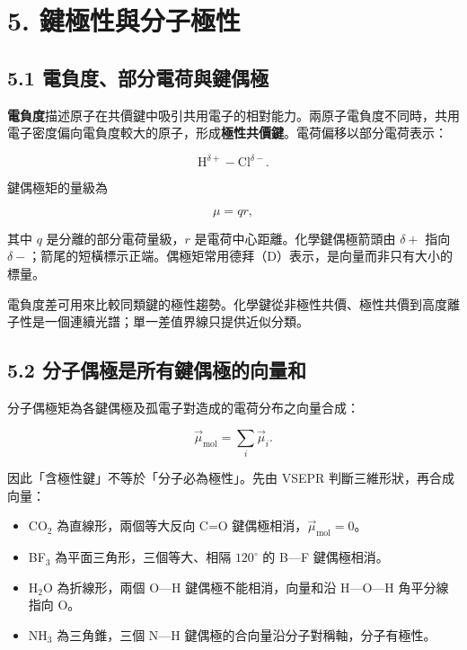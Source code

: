 \documentclass[11pt,a4paper]{article}
\providecommand{\tightlist}{%
  \setlength{\itemsep}{0pt}\setlength{\parskip}{0pt}}
\begin{document}
\section{5. 鍵極性與分子極性}\label{ux9375ux6975ux6027ux8207ux5206ux5b50ux6975ux6027}

\subsection{5.1 電負度、部分電荷與鍵偶極}\label{ux96fbux8ca0ux5ea6ux90e8ux5206ux96fbux8377ux8207ux9375ux5076ux6975}

\textbf{電負度}描述原子在共價鍵中吸引共用電子的相對能力。兩原子電負度不同時，共用電子密度偏向電負度較大的原子，形成\textbf{極性共價鍵}。電荷偏移以部分電荷表示：

\[
\mathrm H^{\delta+}\!-\!\mathrm{Cl}^{\delta-}.
\]

鍵偶極矩的量級為

\[
\mu=qr,
\]

其中 \(q\) 是分離的部分電荷量級，\(r\) 是電荷中心距離。化學鍵偶極箭頭由 \(\delta+\) 指向 \(\delta-\)；箭尾的短橫標示正端。偶極矩常用德拜（D）表示，是向量而非只有大小的標量。

電負度差可用來比較同類鍵的極性趨勢。化學鍵從非極性共價、極性共價到高度離子性是一個連續光譜；單一差值界線只提供近似分類。

\subsection{5.2 分子偶極是所有鍵偶極的向量和}\label{ux5206ux5b50ux5076ux6975ux662fux6240ux6709ux9375ux5076ux6975ux7684ux5411ux91cfux548c}

分子偶極矩為各鍵偶極及孤電子對造成的電荷分布之向量合成：

\[
\vec\mu_{\mathrm{mol}}=\sum_i\vec\mu_i.
\]

因此「含極性鍵」不等於「分子必為極性」。先由 VSEPR 判斷三維形狀，再合成向量：

\begin{itemize}
\tightlist
\item
  CO\(_2\) 為直線形，兩個等大反向 C=O 鍵偶極相消，\(\vec\mu_{\mathrm{mol}}=0\)。
\item
  BF\(_3\) 為平面三角形，三個等大、相隔 \(120^\circ\) 的 B---F 鍵偶極相消。
\item
  H\(_2\)O 為折線形，兩個 O---H 鍵偶極不能相消，向量和沿 H---O---H 角平分線指向 O。
\item
  NH\(_3\) 為三角錐，三個 N---H 鍵偶極的合向量沿分子對稱軸，分子有極性。
\end{itemize}
\end{document}
